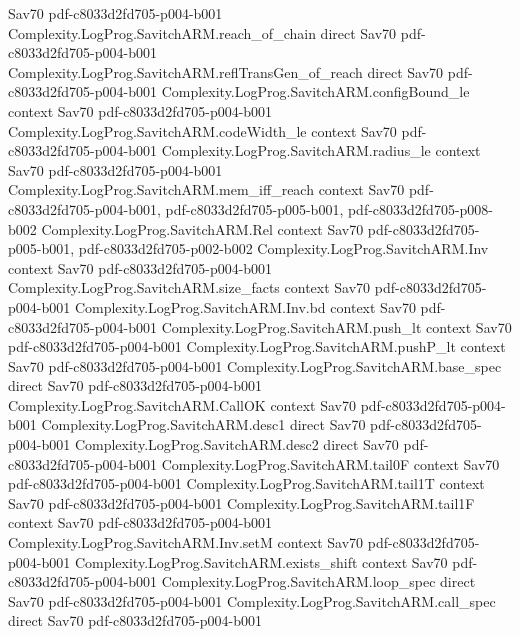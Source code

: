 \begin{theorem}
  {Sav70}
  {pdf-c8033d2fd705-p004-b001}
\proofstep
  {Complexity.LogProg.SavitchARM.reach_of_chain}
  {direct}
  {Sav70}
  {pdf-c8033d2fd705-p004-b001}
\proofstep
  {Complexity.LogProg.SavitchARM.reflTransGen_of_reach}
  {direct}
  {Sav70}
  {pdf-c8033d2fd705-p004-b001}
\proofstep
  {Complexity.LogProg.SavitchARM.configBound_le}
  {context}
  {Sav70}
  {pdf-c8033d2fd705-p004-b001}
\proofstep
  {Complexity.LogProg.SavitchARM.codeWidth_le}
  {context}
  {Sav70}
  {pdf-c8033d2fd705-p004-b001}
\proofstep
  {Complexity.LogProg.SavitchARM.radius_le}
  {context}
  {Sav70}
  {pdf-c8033d2fd705-p004-b001}
\proofstep
  {Complexity.LogProg.SavitchARM.mem_iff_reach}
  {context}
  {Sav70}
  {pdf-c8033d2fd705-p004-b001,
    pdf-c8033d2fd705-p005-b001,
    pdf-c8033d2fd705-p008-b002}
\proofstep
  {Complexity.LogProg.SavitchARM.Rel}
  {context}
  {Sav70}
  {pdf-c8033d2fd705-p005-b001,
    pdf-c8033d2fd705-p002-b002}
\proofstep
  {Complexity.LogProg.SavitchARM.Inv}
  {context}
  {Sav70}
  {pdf-c8033d2fd705-p004-b001}
\proofstep
  {Complexity.LogProg.SavitchARM.size_facts}
  {context}
  {Sav70}
  {pdf-c8033d2fd705-p004-b001}
\proofstep
  {Complexity.LogProg.SavitchARM.Inv.bd}
  {context}
  {Sav70}
  {pdf-c8033d2fd705-p004-b001}
\proofstep
  {Complexity.LogProg.SavitchARM.push_lt}
  {context}
  {Sav70}
  {pdf-c8033d2fd705-p004-b001}
\proofstep
  {Complexity.LogProg.SavitchARM.pushP_lt}
  {context}
  {Sav70}
  {pdf-c8033d2fd705-p004-b001}
\proofstep
  {Complexity.LogProg.SavitchARM.base_spec}
  {direct}
  {Sav70}
  {pdf-c8033d2fd705-p004-b001}
\proofstep
  {Complexity.LogProg.SavitchARM.CallOK}
  {context}
  {Sav70}
  {pdf-c8033d2fd705-p004-b001}
\proofstep
  {Complexity.LogProg.SavitchARM.desc1}
  {direct}
  {Sav70}
  {pdf-c8033d2fd705-p004-b001}
\proofstep
  {Complexity.LogProg.SavitchARM.desc2}
  {direct}
  {Sav70}
  {pdf-c8033d2fd705-p004-b001}
\proofstep
  {Complexity.LogProg.SavitchARM.tail0F}
  {context}
  {Sav70}
  {pdf-c8033d2fd705-p004-b001}
\proofstep
  {Complexity.LogProg.SavitchARM.tail1T}
  {context}
  {Sav70}
  {pdf-c8033d2fd705-p004-b001}
\proofstep
  {Complexity.LogProg.SavitchARM.tail1F}
  {context}
  {Sav70}
  {pdf-c8033d2fd705-p004-b001}
\proofstep
  {Complexity.LogProg.SavitchARM.Inv.setM}
  {context}
  {Sav70}
  {pdf-c8033d2fd705-p004-b001}
\proofstep
  {Complexity.LogProg.SavitchARM.exists_shift}
  {context}
  {Sav70}
  {pdf-c8033d2fd705-p004-b001}
\proofstep
  {Complexity.LogProg.SavitchARM.loop_spec}
  {direct}
  {Sav70}
  {pdf-c8033d2fd705-p004-b001}
\proofstep
  {Complexity.LogProg.SavitchARM.call_spec}
  {direct}
  {Sav70}
  {pdf-c8033d2fd705-p004-b001}

\end{theorem}
